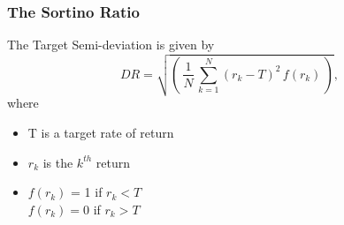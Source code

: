 \documentclass{beamer}
\begin{document}
\begin{frame}

\frametitle{The Sortino Ratio}
\vspace{-1cm}
\Large
The Target Semi-deviation is given by
\[ DR = \sqrt{ \left( \, \frac{1}{N} \, \sum_{k=1}^N (r_k - T)^2\,f(r_k)\, \right)},\] 
where
\begin{itemize}
\item T is a target rate of return
\item  $r_k$ is the $k^{th}$ return
\item $f(r_k)$ = 1  if $r_k < T$ \\  
$f(r_k) = 0 $ if $r_k > T$
\end{itemize}
\end{frame}
\end{document}
